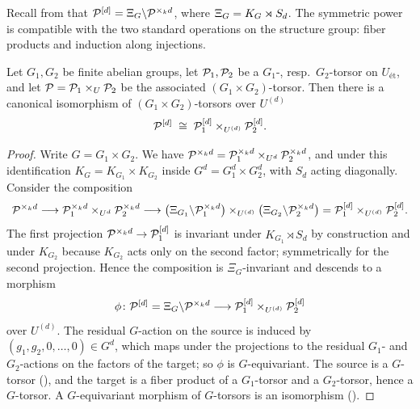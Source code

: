 Recall from  that
$\mathcal{P}^{[d]} = \Xi_G \backslash \mathcal{P}^{\times_k d}$, where
$\Xi_G = K_{G} \rtimes S_d$. The symmetric power is compatible with the two
standard operations on the structure group: fiber products and induction
along injections.

\begin{lemma}\label{lemma:sym_power_product}
    Let $G_1, G_2$ be finite abelian groups, let $\mathcal{P}_1, \mathcal{P}_2$ be a $G_1$-,
    resp.\ $G_2$-torsor on $U_{\text{ét}}$, and let
    $\mathcal{P} = \mathcal{P}_1 \times_U \mathcal{P}_2$ be the associated $(G_1 \times G_2)$-torsor.
    Then there is a canonical isomorphism of $(G_1 \times G_2)$-torsors over
    $U^{(d)}$
    \[
        \mathcal{P}^{[d]} \;\cong\; \mathcal{P}_1^{[d]} \times_{U^{(d)}} \mathcal{P}_2^{[d]}.
    \]
\end{lemma}
\begin{proof}
    Write $G = G_1 \times G_2$. We have
    $\mathcal{P}^{\times_k d} = \mathcal{P}_1^{\times_k d} \times_{U^d} \mathcal{P}_2^{\times_k d}$,
    and under this identification
    $K_G = K_{G_1} \times K_{G_2}$ inside $G^d = G_1^d \times G_2^d$, with
    $S_d$ acting diagonally. Consider the composition
    \[
        \mathcal{P}^{\times_k d}
        \longrightarrow \mathcal{P}_1^{\times_k d} \times_{U^d} \mathcal{P}_2^{\times_k d}
        \longrightarrow
        \bigl(\Xi_{G_1} \backslash \mathcal{P}_1^{\times_k d}\bigr)
        \times_{U^{(d)}}
        \bigl(\Xi_{G_2} \backslash \mathcal{P}_2^{\times_k d}\bigr)
        = \mathcal{P}_1^{[d]} \times_{U^{(d)}} \mathcal{P}_2^{[d]}.
    \]
    The first projection $\mathcal{P}^{\times_k d} \to \mathcal{P}_1^{[d]}$ is invariant under
    $K_{G_1} \rtimes S_d$ by construction and under $K_{G_2}$ because
    $K_{G_2}$ acts only on the second factor; symmetrically for the second
    projection. Hence the composition is $\Xi_G$-invariant and descends to a
    morphism
    \[
        \phi \colon \mathcal{P}^{[d]} = \Xi_G \backslash \mathcal{P}^{\times_k d}
        \longrightarrow \mathcal{P}_1^{[d]} \times_{U^{(d)}} \mathcal{P}_2^{[d]}
    \]
    over $U^{(d)}$. The residual $G$-action on the source is induced by
    $(g_1, g_2, 0, \dots, 0) \in G^d$, which maps under the projections to the
    residual $G_1$- and $G_2$-actions on the factors of the target; so $\phi$
    is $G$-equivariant. The source is a $G$-torsor
    (), and the target is a fiber product of a
    $G_1$-torsor and a $G_2$-torsor, hence a $G$-torsor. A $G$-equivariant
    morphism of $G$-torsors is an isomorphism
    ().
\end{proof}

